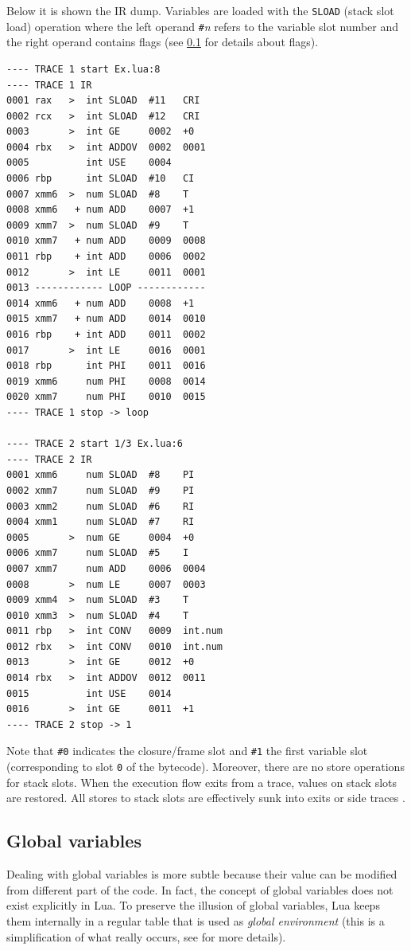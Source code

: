 \noindent
Below it is shown the IR dump. Variables are loaded with the \texttt{SLOAD} (stack slot load) operation where the left operand  \texttt{\#}\textit{n} refers to the variable slot number and the right operand contains flags (see \ref{} for details about flags).

\begin{multicols}{2}
\begin{lstlisting}[style=DumpStyle]
---- TRACE 1 start Ex.lua:8
---- TRACE 1 IR
0001 rax   >  int SLOAD  #11   CRI
0002 rcx   >  int SLOAD  #12   CRI
0003       >  int GE     0002  +0  
0004 rbx   >  int ADDOV  0002  0001
0005          int USE    0004
0006 rbp      int SLOAD  #10   CI
0007 xmm6  >  num SLOAD  #8    T
0008 xmm6   + num ADD    0007  +1  
0009 xmm7  >  num SLOAD  #9    T
0010 xmm7   + num ADD    0009  0008
0011 rbp    + int ADD    0006  0002
0012       >  int LE     0011  0001
0013 ------------ LOOP ------------
0014 xmm6   + num ADD    0008  +1  
0015 xmm7   + num ADD    0014  0010
0016 rbp    + int ADD    0011  0002
0017       >  int LE     0016  0001
0018 rbp      int PHI    0011  0016
0019 xmm6     num PHI    0008  0014
0020 xmm7     num PHI    0010  0015
---- TRACE 1 stop -> loop

---- TRACE 2 start 1/3 Ex.lua:6
---- TRACE 2 IR
0001 xmm6     num SLOAD  #8    PI
0002 xmm7     num SLOAD  #9    PI
0003 xmm2     num SLOAD  #6    RI
0004 xmm1     num SLOAD  #7    RI
0005       >  num GE     0004  +0  
0006 xmm7     num SLOAD  #5    I
0007 xmm7     num ADD    0006  0004
0008       >  num LE     0007  0003
0009 xmm4  >  num SLOAD  #3    T
0010 xmm3  >  num SLOAD  #4    T
0011 rbp   >  int CONV   0009  int.num
0012 rbx   >  int CONV   0010  int.num
0013       >  int GE     0012  +0  
0014 rbx   >  int ADDOV  0012  0011
0015          int USE    0014
0016       >  int GE     0011  +1  
---- TRACE 2 stop -> 1

\end{lstlisting}
\end{multicols}

\noindent
Note that \texttt{\#0} indicates the closure/frame slot and \texttt{\#1} the first variable slot (corresponding to slot \texttt{0} of the bytecode). Moreover, there are no store operations for stack slots. When the execution flow exits from a trace, values on stack slots are restored. All stores to stack slots are effectively sunk into exits or side traces \cite{luajit-ir}.

\subsection{Global variables}
Dealing with global variables is more subtle because their value can be modified from different part of the code. In fact, the concept of global variables does not exist explicitly in Lua. To preserve the illusion of global variables, Lua keeps them internally in a regular table that is used as \textit{global environment} (this is a simplification of what really occurs, see \cite{lua-book-chapter22} for more details). 

